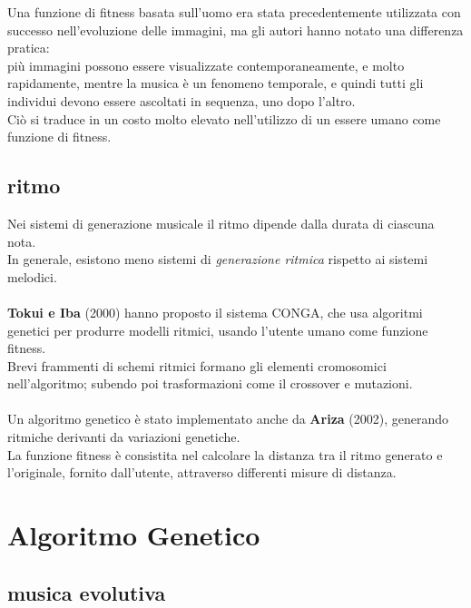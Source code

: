 \documentclass[a4paper,12pt]{report}
\begin{document}
Una funzione di fitness basata sull’uomo era stata precedentemente utilizzata con successo nell’evoluzione delle immagini, 
ma gli autori hanno notato una differenza pratica: \\
più immagini possono essere visualizzate contemporaneamente, e molto rapidamente, 
mentre la musica è un fenomeno temporale, e quindi tutti gli individui devono essere ascoltati in sequenza, uno dopo l'altro. \\
Ciò si traduce in un costo molto elevato nell’utilizzo di un essere umano come funzione di fitness. 

\subsection{ritmo}

Nei sistemi di generazione musicale il ritmo dipende dalla durata di ciascuna nota. \\
In generale, esistono meno sistemi di \textit{generazione ritmica} rispetto ai sistemi melodici. \\
\\
\textbf{Tokui e Iba} (2000) hanno proposto il sistema CONGA, che usa algoritmi genetici per produrre modelli ritmici, usando l'utente umano come funzione fitness. \\
Brevi frammenti di schemi ritmici formano gli elementi cromosomici nell'algoritmo; subendo poi trasformazioni come il crossover e mutazioni. \\
\\
Un algoritmo genetico è stato implementato anche da \textbf{Ariza} (2002), generando ritmiche derivanti da variazioni genetiche. \\
La funzione fitness è consistita nel calcolare la distanza tra il ritmo generato e l'originale, fornito dall'utente, attraverso differenti misure di distanza. 

\section{Algoritmo Genetico}

\subsection{musica evolutiva}
\end{document}
